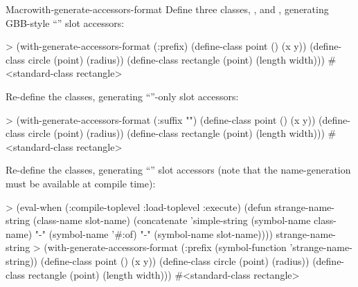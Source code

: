 \documentclass[10pt,twoside,english,pdftex]{article}
\begin{document}
\begin{functiondoc}{Macro}{with-generate-accessors-format}
\fnexamples
Define three classes, ,  and
, generating GBB-style
``'' slot accessors:
%
\W\supp
\begin{example}
> (with-generate-accessors-format (:prefix)
    (define-class point ()
      (x y))
    (define-class circle (point)
      (radius))
    (define-class rectangle (point)
      (length width)))
#<standard-class rectangle>
\end{example}
%
Re-define the classes, generating ``''-only slot accessors:
%
\W\supp\notpretop
\begin{example}
> (with-generate-accessors-format (:suffix "")
    (define-class point ()
      (x y))
    (define-class circle (point)
      (radius))
    (define-class rectangle (point)
      (length width)))
#<standard-class rectangle>
\end{example}
%
Re-define the classes, generating
``'' slot accessors (note that the
 name-generation  must be available
at compile time):
%
\W\supp\notpretop
\begin{example}
> (eval-when (:compile-toplevel :load-toplevel :execute)
    (defun strange-name-string (class-name slot-name)
      (concatenate 'simple-string
        (symbol-name class-name) "-" 
        (symbol-name '#:of) "-" 
        (symbol-name slot-name))))
strange-name-string
> (with-generate-accessors-format (:prefix (symbol-function 'strange-name-string))
    (define-class point ()
      (x y))
    (define-class circle (point)
      (radius))
    (define-class rectangle (point)
      (length width)))
#<standard-class rectangle>
\end{example}

\end{functiondoc}

\end{document}

